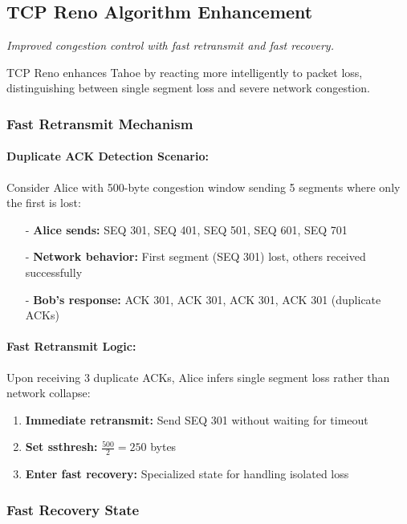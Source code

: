 \documentclass[../../compsys.tex]{subfiles}
\begin{document}
\newpage
\subsection{TCP Reno Algorithm Enhancement}
\textit{Improved congestion control with fast retransmit and fast recovery.}

TCP Reno enhances Tahoe by reacting more intelligently to packet loss, distinguishing between single segment loss and severe network congestion.

\subsubsection{Fast Retransmit Mechanism}

\paragraph{Duplicate ACK Detection Scenario:}
Consider Alice with 500-byte congestion window sending 5 segments where only the first is lost:

\begin{itemize}
  \item[-] \textbf{Alice sends:} SEQ 301, SEQ 401, SEQ 501, SEQ 601, SEQ 701
  \item[-] \textbf{Network behavior:} First segment (SEQ 301) lost, others received successfully
  \item[-] \textbf{Bob's response:} ACK 301, ACK 301, ACK 301, ACK 301 (duplicate ACKs)
\end{itemize}

\paragraph{Fast Retransmit Logic:}
Upon receiving 3 duplicate ACKs, Alice infers single segment loss rather than network collapse:
\begin{enumerate}
  \item \textbf{Immediate retransmit:} Send SEQ 301 without waiting for timeout
  \item \textbf{Set ssthresh:} $\frac{500}{2} = 250$ bytes
  \item \textbf{Enter fast recovery:} Specialized state for handling isolated loss
\end{enumerate}

\subsubsection{Fast Recovery State}
\end{document}
